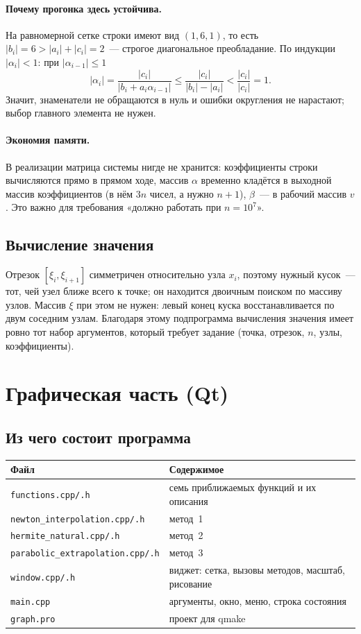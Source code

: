 \documentclass[11pt,a4paper]{report}
\begin{document}
\paragraph{Почему прогонка здесь устойчива.} На равномерной сетке строки имеют
вид $(1,6,1)$, то есть $|b_i|=6>|a_i|+|c_i|=2$~--- строгое диагональное
преобладание. По индукции $|\alpha_i|<1$: при $|\alpha_{i-1}|\le1$
\[
|\alpha_i|=\frac{|c_i|}{|b_i+a_i\alpha_{i-1}|}\le\frac{|c_i|}{|b_i|-|a_i|}
<\frac{|c_i|}{|c_i|}=1 .
\]
Значит, знаменатели не обращаются в нуль и ошибки округления не нарастают;
выбор главного элемента не нужен.

\paragraph{Экономия памяти.} В реализации матрица системы нигде не хранится:
коэффициенты строки вычисляются прямо в прямом ходе, массив $\alpha$ временно
кладётся в выходной массив коэффициентов (в нём $3n$ чисел, а нужно $n+1$),
$\beta$~--- в рабочий массив $v$. Это важно для требования «должно работать при
$n=10^7$».

\subsection{Вычисление значения}

Отрезок $[\xi_i,\xi_{i+1}]$ симметричен относительно узла $x_i$, поэтому нужный
кусок~--- тот, чей узел ближе всего к точке; он находится двоичным поиском по
массиву узлов. Массив $\xi$ при этом не нужен: левый конец куска
восстанавливается по двум соседним узлам. Благодаря этому подпрограмма
вычисления значения имеет ровно тот набор аргументов, который требует
задание (точка, отрезок, $n$, узлы, коэффициенты).

\section{Графическая часть (Qt)}

\subsection{Из чего состоит программа}

\begin{center}
\begin{tabular}{ll}
\toprule
Файл & Содержимое \\
\midrule
\texttt{functions.cpp/.h} & семь приближаемых функций и их описания \\
\texttt{newton\_interpolation.cpp/.h} & метод~1 \\
\texttt{hermite\_natural.cpp/.h} & метод~2 \\
\texttt{parabolic\_extrapolation.cpp/.h} & метод~3 \\
\texttt{window.cpp/.h} & виджет: сетка, вызовы методов, масштаб, рисование \\
\texttt{main.cpp} & аргументы, окно, меню, строка состояния \\
\texttt{graph.pro} & проект для qmake \\
\bottomrule
\end{tabular}
\end{center}
\end{document}
